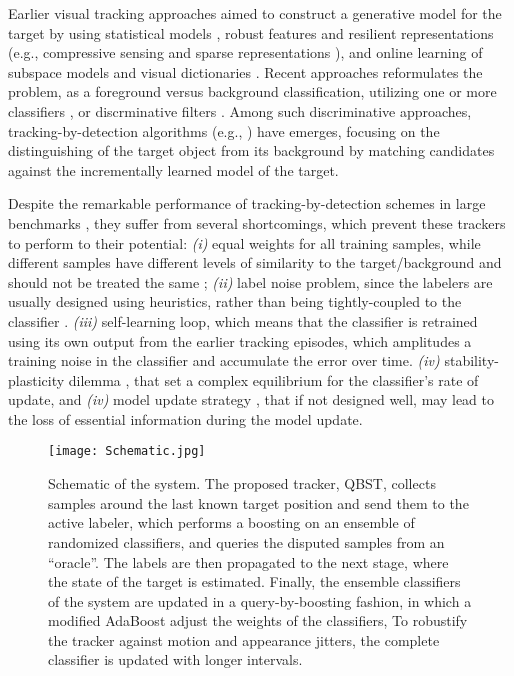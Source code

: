 \documentclass[10pt, conference, compsocconf]{IEEEtran}
\begin{document}
Earlier visual tracking approaches aimed to construct a generative model for the target by using statistical models \cite{comaniciu2003kernel,perez2002color,oron2015locally}, robust features \cite{he2013visual} and resilient representations (e.g., compressive sensing \cite{zhang2012real} and sparse representations \cite{bao2012real}), and online learning of subspace models \cite{ross2008incremental} and visual dictionaries \cite{taalimi2015online}. Recent approaches reformulates the problem, as a foreground versus background classification, utilizing one or more classifiers \cite{avidan2007ensemble}, or discrminative filters \cite{henriques2012exploiting,henriques2015high,kiani2015correlation}. Among such discriminative approaches, tracking-by-detection algorithms (e.g., \cite{babenko2009visual}) have emerges, focusing on the distinguishing of the target object from its background by matching candidates against the incrementally learned model of the target.

Despite the remarkable performance of tracking-by-detection schemes in large benchmarks \cite{wu2013online,kristan2015visual}, they suffer from several shortcomings, which prevent these trackers to perform to their potential: \textit{(i)} equal weights for all training samples, while different samples have different levels of similarity to the target/background and should not be treated the same \cite{henriques2012exploiting}; \textit{(ii)} label noise problem, since the labelers are usually designed using heuristics, rather than being tightly-coupled to the classifier \cite{hare2011struck}. \textit{(iii)} self-learning loop, which means that the classifier is retrained using its own output from the earlier tracking episodes, which amplitudes a training noise in the classifier and accumulate the error over time. \textit{(iv)} stability-plasticity dilemma \cite{grabner2008semi}, that set a complex equilibrium for the classifier's rate of update, and \textit{(iv)} model update strategy \cite{matthews2004template}, that if not designed well, may lead to the loss of essential information during the model update.

\begin{figure}
\texttt{[image: Schematic.jpg]}
\caption{Schematic of the system. The proposed tracker, QBST, collects samples around the last known target position and send them to the active labeler, which performs a boosting on an ensemble of randomized classifiers, and queries the disputed samples from an ``oracle''. The labels are then propagated to the next stage, where the state of the target is estimated. Finally, the ensemble classifiers of the system are updated in a query-by-boosting \cite{abe1998query} fashion, in which a modified AdaBoost adjust the weights of the classifiers, To robustify the tracker against motion and appearance jitters, the complete classifier is updated with longer intervals.}
\label{fig:schematic}
\vspace{-0.5 cm}
\end{figure}
\end{document}
